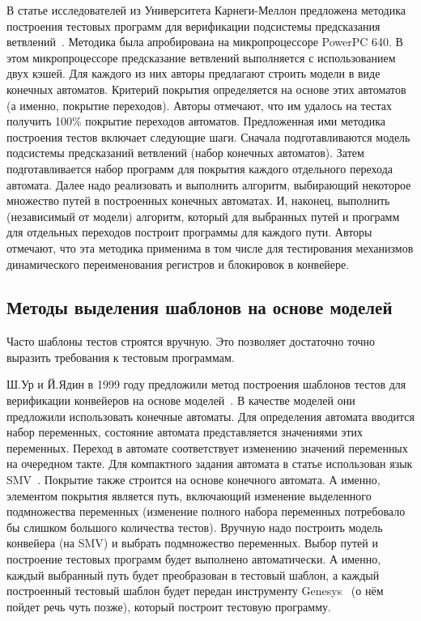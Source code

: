 В статье исследователей из Университета Карнеги-Меллон предложена методика построения тестовых программ для верификации подсистемы предсказания ветвлений~\cite{Branches99}. Методика была апробирована на микропроцессоре PowerPC 640. В этом микропроцессоре предсказание ветвлений выполняется с использованием двух кэшей. Для каждого из них авторы предлагают строить модели в виде конечных автоматов. Критерий покрытия определяется на основе этих автоматов (а именно, покрытие переходов). Авторы отмечают, что им удалось на тестах получить 100\% покрытие переходов автоматов. Предложенная ими методика построения тестов включает следующие шаги. Сначала подготавливаются модель подсистемы предсказаний ветвлений (набор конечных автоматов). Затем подготавливается набор программ для покрытия каждого отдельного перехода автомата. Далее надо реализовать и выполнить алгоритм, выбирающий некоторое множество путей в построенных конечных автоматах. И, наконец, выполнить (независимый от модели) алгоритм, который для выбранных путей и программ для отдельных переходов построит программы для каждого пути. Авторы отмечают, что эта методика применима в том числе для тестирования механизмов динамического переименования регистров и блокировок в конвейере.

\subsection{Методы выделения шаблонов на основе моделей}\label{sec:templates_generation_methods}

Часто шаблоны тестов строятся вручную. Это позволяет достаточно точно выразить требования к тестовым программам.

Ш.Ур и Й.Ядин в 1999 году предложили метод построения шаблонов тестов для верификации конвейеров на основе моделей~\cite{UrFSM}. В качестве моделей они предложили использовать конечные автоматы. Для определения автомата вводится набор переменных, состояние автомата представляется значениями этих переменных. Переход в автомате соответствует изменению значений переменных на очередном такте. Для компактного задания автомата в статье использован язык SMV~\cite{SMV}. Покрытие также строится на основе конечного автомата. А именно, элементом покрытия является путь, включающий изменение выделенного подмножества переменных (изменение полного набора переменных потребовало бы слишком большого количества тестов). Вручную надо построить модель конвейера (на SMV) и выбрать подмножество переменных. Выбор путей и построение тестовых программ будет выполнено автоматически. А именно, каждый выбранный путь будет преобразован в тестовый шаблон, а каждый построенный тестовый шаблон будет передан инструменту Genesys~\cite{GenesysPro} (о нём пойдет речь чуть позже), который построит тестовую программу.

